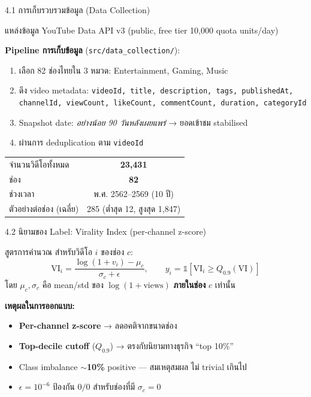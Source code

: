 \documentclass[aspectratio=169,11pt,xcolor=dvipsnames]{beamer}
\newcommand{\hl}[1]{\textcolor{kmitlOrange}{\textbf{#1}}}
\begin{document}
\begin{frame}{4.1 การเก็บรวบรวมข้อมูล (Data Collection)}
  \begin{block}{แหล่งข้อมูล}
    YouTube Data API v3 (public, free tier 10{,}000 quota units/day)
  \end{block}
  \textbf{Pipeline การเก็บข้อมูล} (\texttt{src/data\_collection/}):
  \begin{enumerate}
    \item เลือก 82 ช่องไทยใน 3 หมวด: Entertainment, Gaming, Music
    \item ดึง video metadata: \texttt{videoId, title, description, tags, publishedAt, channelId, viewCount, likeCount, commentCount, duration, categoryId}
    \item Snapshot date: \emph{อย่างน้อย 90 วันหลังเผยแพร่} → ยอดเข้าชม stabilised
    \item ผ่านการ deduplication ตาม \texttt{videoId}
  \end{enumerate}
  \vspace{0.4em}
  \begin{center}
    \begin{tabular}{lc}
      \toprule
      จำนวนวิดีโอทั้งหมด & \hl{23{,}431}\\
      ช่อง & \hl{82}\\
      ช่วงเวลา & พ.ศ. 2562--2569 (10 ปี)\\
      ตัวอย่างต่อช่อง (เฉลี่ย) & 285 (ต่ำสุด 12, สูงสุด 1{,}847)\\
      \bottomrule
    \end{tabular}
  \end{center}
\end{frame}

\begin{frame}{4.2 นิยามของ Label: Virality Index (per-channel z-score)}
  \begin{block}{สูตรการคำนวณ}
    สำหรับวิดีโอ $i$ ของช่อง $c$:
    \[
      \text{VI}_i = \frac{\log(1 + v_i) - \mu_c}{\sigma_c + \epsilon}
      , \qquad
      y_i = \mathbb{1}\!\left[\text{VI}_i \geq Q_{0.9}(\text{VI})\right]
    \]
    โดย $\mu_c, \sigma_c$ คือ mean/std ของ $\log(1+\text{views})$ \hl{ภายในช่อง} $c$ เท่านั้น
  \end{block}

  \textbf{เหตุผลในการออกแบบ:}
  \begin{itemize}
    \item \hl{Per-channel z-score} → ลดอคติจากขนาดช่อง
    \item \hl{Top-decile cutoff} ($Q_{0.9}$) → ตรงกับนิยามทางธุรกิจ ``top 10\%''
    \item Class imbalance \hl{$\sim$10\%} positive — สมเหตุสมผล ไม่ trivial เกินไป
    \item $\epsilon = 10^{-6}$ ป้องกัน $0/0$ สำหรับช่องที่มี $\sigma_c = 0$
  \end{itemize}
\end{frame}
\end{document}
